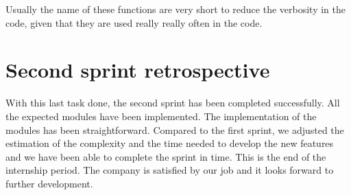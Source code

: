 Usually the name of these functions are very short to reduce the verbosity in the code, given that they are used really really often in the code.

\section{Second sprint retrospective}

With this last task done, the second sprint has been completed successfully. All the expected modules have been implemented. The implementation of the modules has been straightforward. Compared to the first sprint, we adjusted the estimation of the complexity and the time needed to develop the new features and we have been able to complete the sprint in time. This is the end of the internship period. The company is satisfied by our job and it looks forward to further development.

